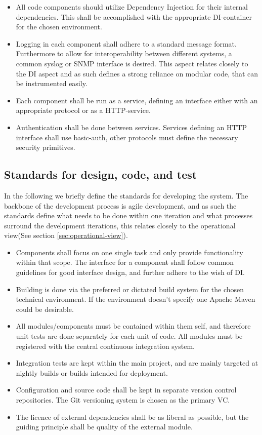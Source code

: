 \begin{itemize}
    \item All code components should utilize Dependency Injection for their
        internal dependencies. This shall be accomplished with the appropriate
        DI-container for the chosen environment.
    \item Logging in each component shall adhere to a standard message format.
        Furthermore to allow for interoperability between different systems, a
        common syslog or SNMP interface is desired. This aspect relates closely
        to the DI aspect and as such defines a strong reliance on modular code,
        that can be instrumented easily.
    \item Each component shall be run as a service, defining an interface
        either with an appropriate protocol or as a HTTP-service.
    \item Authentication shall be done between services. Services defining an
        HTTP interface shall use basic-auth, other protocols must define the
        necessary security primitives.
\end{itemize}

\subsection{Standards for design, code, and test}
\label{sec:stand-design-code}
In the following we briefly define the standards for developing the system. The
backbone of the development process is agile development, and as such the
standards define what needs to be done within one iteration and what processes
surround the development iterations, this relates closely to the operational
view(See section \ref{sec:operational-view}).

\begin{itemize}
    \item Components shall focus on one single task and only provide
        functionality within that scope. The interface for a component shall
        follow common guidelines for good interface design, and further adhere
        to the wish of DI.
    \item Building is done via the preferred or dictated build system for the
        chosen technical environment. If the environment doesn't specify one
        Apache Maven could be desirable.
    \item All modules/components must be contained within them self, and
        therefore unit tests are done separately for each unit of code. All
        modules must be registered with the central continuous integration
        system.
    \item Integration tests are kept within the main project, and are mainly
        targeted at nightly builds or builds intended for deployment.
    \item Configuration and source code shall be kept in separate version
        control repositories. The Git versioning system is chosen as the
        primary VC.
    \item The licence of external dependencies shall be as liberal as possible,
        but the guiding principle shall be quality of the external module.
\end{itemize}


